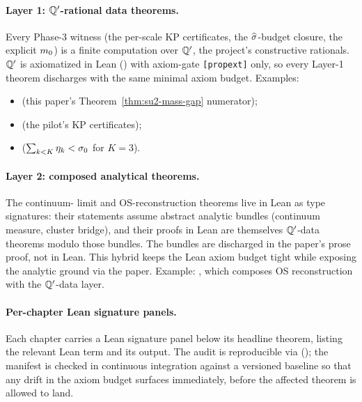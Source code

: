 \paragraph*{Layer 1: $\mathbb{Q}'$-rational data theorems.}  Every Phase-3
witness (the per-scale KP certificates, the $\widehat{\sigma}$-budget
closure, the explicit $m_0$) is a finite computation over
$\mathbb{Q}'$, the project's constructive rationals.  $\mathbb{Q}'$ is axiomatized
in Lean () with
axiom-gate \texttt{[propext]} only, so every Layer-1 theorem
discharges with the same minimal axiom budget.  Examples:
\begin{itemize}[nosep]
  \item {} (this paper's
    Theorem~\ref{thm:su2-mass-gap} numerator);
  \item {}
    (the pilot's KP certificates);
  \item {}
    ($\sum_{k < K} \eta_k < \sigma_0$ for $K = 3$).
\end{itemize}

\paragraph*{Layer 2: composed analytical theorems.}  The continuum-
limit and OS-reconstruction theorems live in Lean as type
signatures: their statements assume abstract analytic bundles
(continuum measure, cluster bridge), and their proofs in Lean are
themselves $\mathbb{Q}'$-data theorems modulo those bundles.  The bundles
are discharged in the paper's prose proof, not in Lean.  This
hybrid keeps the Lean axiom budget tight while exposing the
analytic ground via the paper.  Example:
, which composes OS reconstruction with
the $\mathbb{Q}'$-data layer.

\paragraph*{Per-chapter Lean signature panels.}  Each chapter
carries a Lean signature panel below its headline theorem,
listing the relevant Lean term and its 
output.  The audit is reproducible via 
(); the manifest is checked
in continuous integration against a versioned baseline so that any
drift in the axiom budget surfaces immediately, before the affected
theorem is allowed to land.

